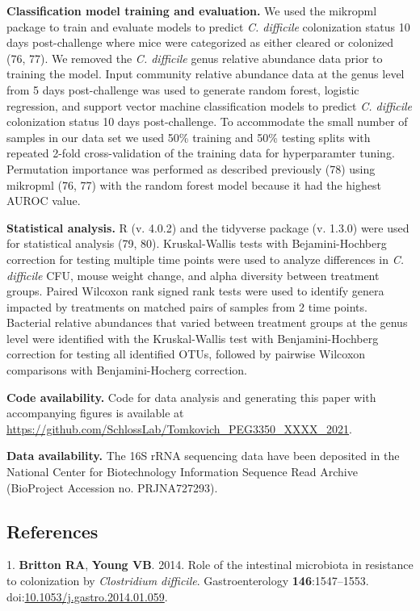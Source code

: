 \documentclass[
  11pt,
]{article}
\begin{document}
\textbf{Classification model training and evaluation.} We used the
mikropml package to train and evaluate models to predict \emph{C.
difficile} colonization status 10 days post-challenge where mice were
categorized as either cleared or colonized (76, 77). We removed the
\emph{C. difficile} genus relative abundance data prior to training the
model. Input community relative abundance data at the genus level from 5
days post-challenge was used to generate random forest, logistic
regression, and support vector machine classification models to predict
\emph{C. difficile} colonization status 10 days post-challenge. To
accommodate the small number of samples in our data set we used 50\%
training and 50\% testing splits with repeated 2-fold cross-validation
of the training data for hyperparamter tuning. Permutation importance
was performed as described previously (78) using mikropml (76, 77) with
the random forest model because it had the highest AUROC value.

\textbf{Statistical analysis.} R (v. 4.0.2) and the tidyverse package
(v. 1.3.0) were used for statistical analysis (79, 80). Kruskal-Wallis
tests with Bejamini-Hochberg correction for testing multiple time points
were used to analyze differences in \emph{C. difficile} CFU, mouse
weight change, and alpha diversity between treatment groups. Paired
Wilcoxon rank signed rank tests were used to identify genera impacted by
treatments on matched pairs of samples from 2 time points. Bacterial
relative abundances that varied between treatment groups at the genus
level were identified with the Kruskal-Wallis test with
Benjamini-Hochberg correction for testing all identified OTUs, followed
by pairwise Wilcoxon comparisons with Benjamini-Hocherg correction.

\textbf{Code availability.} Code for data analysis and generating this
paper with accompanying figures is available at
\url{https://github.com/SchlossLab/Tomkovich_PEG3350_XXXX_2021}.

\textbf{Data availability.} The 16S rRNA sequencing data have been
deposited in the National Center for Biotechnology Information Sequence
Read Archive (BioProject Accession no. PRJNA727293).

\newpage

\hypertarget{references}{%
\subsection{References}\label{references}}

\hypertarget{refs}{}
\leavevmode\hypertarget{ref-Britton2014}{}%
1. \textbf{Britton RA}, \textbf{Young VB}. 2014. Role of the intestinal
microbiota in resistance to colonization by \emph{Clostridium
difficile}. Gastroenterology \textbf{146}:1547--1553.
doi:\href{https://doi.org/10.1053/j.gastro.2014.01.059}{10.1053/j.gastro.2014.01.059}.
\end{document}
